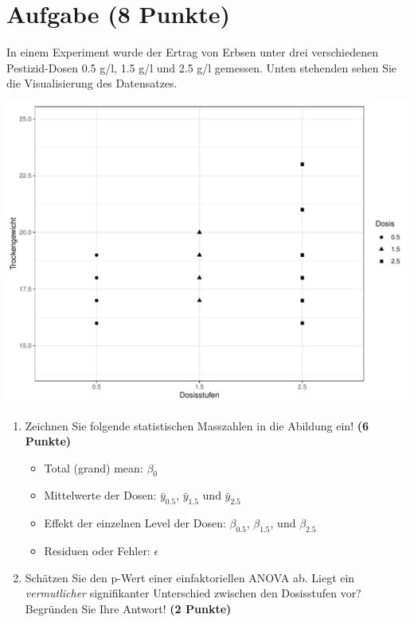 \documentclass[a4paper, 10pt]{scrartcl}\usepackage[]{graphicx}\usepackage[]{xcolor}
\makeatletter
\def\maxwidth{ %
  \ifdim\Gin@nat@width>\linewidth
    \linewidth
  \else
    \Gin@nat@width
  \fi
}
\newenvironment{knitrout}{}{} %
\makeatother
\begin{document}
\section{Aufgabe \hfill (8 Punkte)}

In einem Experiment wurde der Ertrag von Erbsen unter drei verschiedenen
Pestizid-Dosen 0.5 g/l, 1.5 g/l und 2.5 g/l gemessen. Unten stehenden sehen
Sie die Visualisierung des Datensatzes.

\begin{knitrout}
\color{fgcolor}

{\centering \includegraphics[width=\maxwidth]{img/anova-01-a-1} 

}


\end{knitrout}

\begin{enumerate}
\item Zeichnen Sie folgende statistischen Masszahlen in die Abildung ein! \textbf{(6 Punkte)}
  \begin{itemize}
  \item Total (grand) mean: $\beta_0$
  \item Mittelwerte der Dosen: $\bar{y}_{0.5}$, $\bar{y}_{1.5}$ und $\bar{y}_{2.5}$
  \item Effekt der einzelnen Level der Dosen: $\beta_{0.5}$, $\beta_{1.5}$,
    und $\beta_{2.5}$
  \item Residuen oder Fehler: $\epsilon$
  \end{itemize}
\item Sch{\"a}tzen Sie den p-Wert einer einfaktoriellen ANOVA ab. Liegt ein
  \textit{vermutlicher} signifikanter Unterschied zwischen den Dosisstufen
  vor? Begr{\"u}nden Sie Ihre Antwort! \textbf{(2 Punkte)}
\end{enumerate}
 
\end{document}
